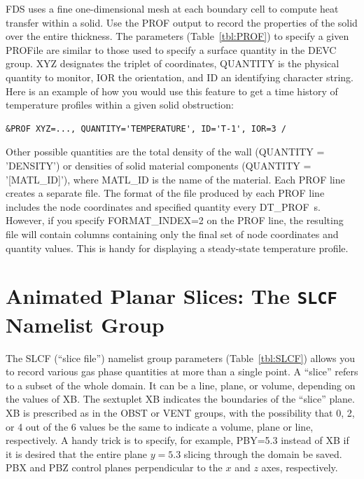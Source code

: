 \documentclass[11pt]{book}
\begin{document}
FDS uses a fine one-dimensional mesh at each boundary cell to compute heat transfer within a solid. Use the {\ct PROF} output to record the properties of the solid over the entire thickness. The parameters (Table~\ref{tbl:PROF}) to specify a given {\ct PROF}ile are similar to those used to specify a surface quantity in the {\ct DEVC} group. {\ct XYZ} designates the triplet of coordinates, {\ct QUANTITY} is the physical quantity to monitor, {\ct IOR} the orientation, and {\ct ID} an identifying character string. Here is an example of how you would use this feature to get a time history of temperature profiles within a given solid obstruction:
\begin{lstlisting}
&PROF XYZ=..., QUANTITY='TEMPERATURE', ID='T-1', IOR=3 /
\end{lstlisting}
Other possible quantities are the total density of the wall ({\ct QUANTITY = 'DENSITY'}) or densities of solid material components ({\ct QUANTITY = '[MATL\_ID]'}), where {\ct MATL\_ID} is the name of the material. Each {\ct PROF} line creates a separate file. The format of the file produced by each {\ct PROF} line includes the node coordinates and specified quantity every {\ct DT\_PROF}~s. However, if you specify {\ct FORMAT\_INDEX=2} on the {\ct PROF} line, the resulting file will contain columns containing only the final set of node coordinates and quantity values. This is handy for displaying a steady-state temperature profile.



\section{Animated Planar Slices: The \texorpdfstring{{\tt SLCF}}{SLCF} Namelist Group}
\label{info:SLCF}

The {\ct SLCF} (``slice file'') namelist group parameters (Table~\ref{tbl:SLCF}) allows you to record various gas phase quantities at more than a single point. A ``slice'' refers to a subset of the whole domain. It can be a line, plane, or volume, depending on the values of {\ct XB}. The sextuplet {\ct XB} indicates the boundaries of the ``slice'' plane. {\ct XB} is prescribed as in the {\ct OBST} or {\ct VENT} groups, with the possibility that 0, 2, or 4 out of the 6 values be the same to indicate a volume, plane or line, respectively. A handy trick is to specify, for example, {\ct PBY=5.3} instead of {\ct XB} if it is desired that the entire plane $y=5.3$ slicing through the domain be saved. {\ct PBX} and {\ct PBZ} control planes perpendicular to the $x$ and $z$ axes, respectively.
\end{document}
